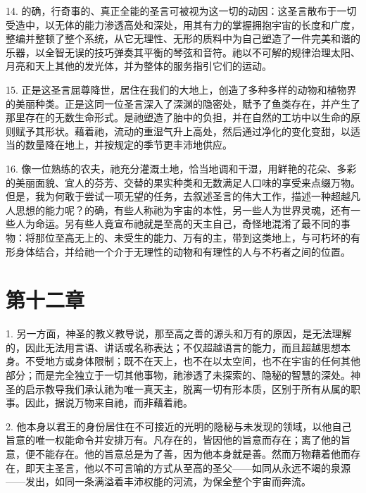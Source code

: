 14. 的确，行奇事的、真正全能的圣言可被视为这一切的动因：这圣言散布于一切受造中，以无体的能力渗透高处和深处，用其有力的掌握拥抱宇宙的长度和广度，整编并整顿了整个系统，从它无理性、无形的质料中为自己塑造了一件完美和谐的乐器，以全智无误的技巧弹奏其平衡的琴弦和音符。祂以不可解的规律治理太阳、月亮和天上其他的发光体，并为整体的服务指引它们的运动。\par

15. 正是这圣言屈尊降世，居住在我们的大地上，创造了多种多样的动物和植物界的美丽种类。正是这同一位圣言深入了深渊的隐密处，赋予了鱼类存在，并产生了那里存在的无数生命形式。是祂塑造了胎中的负担，并在自然的工坊中以生命的原则赋予其形状。藉着祂，流动的重湿气升上高处，然后通过净化的变化变甜，以适当的数量降在地上，并按规定的季节更丰沛地供应。\par

16. 像一位熟练的农夫，祂充分灌溉土地，恰当地调和干湿，用鲜艳的花朵、多彩的美丽面貌、宜人的芬芳、交替的果实种类和无数满足人口味的享受来点缀万物。但是，我为何敢于尝试一项无望的任务，去叙述圣言的伟大工作，描述一种超越凡人思想的能力呢？的确，有些人称祂为宇宙的本性，另一些人为世界灵魂，还有一些人为命运。另有些人竟宣布祂就是至高的天主自己，奇怪地混淆了最不同的事物：将那位至高无上的、未受生的能力、万有的主，带到这类地上，与可朽坏的有形身体结合，并给祂一个介于无理性的动物和有理性的人与不朽者之间的位置。\par


\section{第十二章}

1. 另一方面，神圣的教义教导说，那至高之善的源头和万有的原因，是无法理解的，因此无法用言语、讲话或名称表达；不仅超越语言的能力，而且超越思想本身。不受地方或身体限制；既不在天上，也不在以太空间，也不在宇宙的任何其他部分；而是完全独立于一切其他事物，祂渗透了未探索的、隐秘的智慧的深处。神圣的启示教导我们承认祂为唯一真天主，脱离一切有形本质，区别于所有从属的职事。因此，据说万物来自祂，而非藉着祂。\par

2. 他本身以君王的身份居住在不可接近的光明的隐秘与未发现的领域，以他自己旨意的唯一权能命令并安排万有。凡存在的，皆因他的旨意而存在；离了他的旨意，便不能存在。他的旨意总是为了善，因为他本身就是善。然而万物藉着他而存在，即天主圣言，他以不可言喻的方式从至高的圣父——如同从永远不竭的泉源——发出，如同一条满溢着丰沛权能的河流，为保全整个宇宙而奔流。\par

